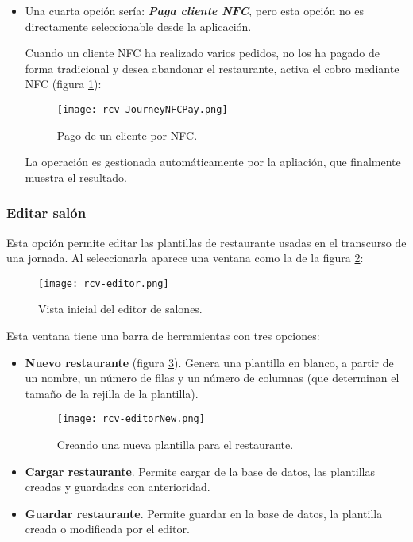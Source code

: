 \begin{itemize}
\item Una cuarta opción sería: \textbf{\emph{Paga cliente \acs{NFC}}}, pero
esta opción no es directamente seleccionable desde la aplicación.

Cuando un cliente \acs{NFC} ha realizado varios pedidos, no los ha pagado de
forma tradicional y desea abandonar el restaurante, activa el cobro mediante 
\acs{NFC} (figura \ref{fig:rcv-JourneyNFCPay}):

  \begin{figure}[ht]
    \begin{center}
      \texttt{[image: rcv-JourneyNFCPay.png]}
      \caption{Pago de un cliente por \acs{NFC}.}
      \label{fig:rcv-JourneyNFCPay}
    \end{center}
  \end{figure}

La operación es gestionada automáticamente por la apliación, que finalmente
muestra el resultado.
\end{itemize}

\subsubsection{Editar salón}
Esta opción permite editar las plantillas de restaurante usadas en el
transcurso de una jornada. Al seleccionarla aparece una ventana como la de
la figura \ref{fig:rcv-editor}:

  \begin{figure}[ht]
    \begin{center}
      \texttt{[image: rcv-editor.png]}
      \caption{Vista inicial del editor de salones.}
      \label{fig:rcv-editor}
    \end{center}
  \end{figure}

Esta ventana tiene una barra de herramientas con tres opciones:
\begin{itemize}
\item \textbf{Nuevo restaurante} (figura \ref{fig:rcv-editorNew}). Genera
una plantilla en blanco, a partir de un nombre, un número de filas y un
número de columnas (que determinan el tamaño de la rejilla de la plantilla).

  \begin{figure}[ht]
    \begin{center}
      \texttt{[image: rcv-editorNew.png]}
      \caption{Creando una nueva plantilla para el restaurante.}
      \label{fig:rcv-editorNew}
    \end{center}
  \end{figure}

\item \textbf{Cargar restaurante}. Permite cargar de la base de datos, las 
plantillas creadas y guardadas con anterioridad.
\item \textbf{Guardar restaurante}. Permite guardar en la base de datos, la 
plantilla creada o modificada por el editor.
\end{itemize}

